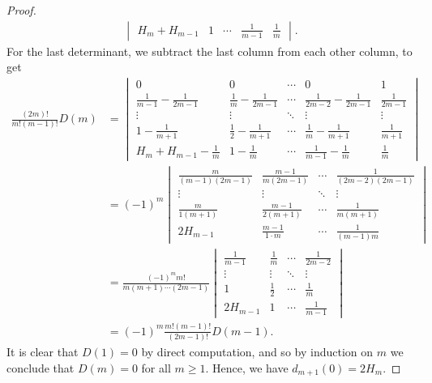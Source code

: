 \documentclass[11pt]{amsart}
\theoremstyle{definition}
\numberwithin{equation}{subsection}
\theoremstyle{plain}
\theoremstyle{plain}
\theoremstyle{plain}
\theoremstyle{plain}
\theoremstyle{plain}
\theoremstyle{plain}
\theoremstyle{plain}
\theoremstyle{plain}
\theoremstyle{plain}
\theoremstyle{plain}
\theoremstyle{plain}
\theoremstyle{plain}
\theoremstyle{definition}
\theoremstyle{definition}
\theoremstyle{definition}
\theoremstyle{remark}
\renewcommand{\(}{\textup{(}}
\renewcommand{\)}{\textup{)}}
\begin{document}
\begin{proof}
\begin{align*}
\begin{vmatrix}
          H_m+H_{m-1} & 1 & \cdots
           & \frac{1}{m-1} & \frac{1}{m}
        \end{vmatrix}.
    \end{align*}
For the last determinant, we subtract the last column from each other column, to get
    \begin{align*}
        \frac{(2m)!}{m!(m-1)!} D(m)
        &=
        \begin{vmatrix}
          0 & 0 & \cdots & 0 & 1 \\
          \frac{1}{m-1}-\frac{1}{2m-1} & \frac{1}{m}-\frac{1}{2m-1} & \cdots
           & \frac{1}{2m-2}-\frac{1}{2m-1} & \frac{1}{2m-1} \\
          \vdots & \vdots & \ddots & \vdots & \vdots \\
          1-\frac{1}{m+1} & \frac{1}{2}-\frac{1}{m+1} & \cdots
           & \frac{1}{m}-\frac{1}{m+1} & \frac{1}{m+1} \\
          H_m+H_{m-1}-\frac{1}{m} & 1-\frac{1}{m} & \cdots
           & \frac{1}{m-1}-\frac{1}{m} & \frac{1}{m}
        \end{vmatrix}\\
        &=
        (-1)^m
        \begin{vmatrix}
          \frac{m}{(m-1)(2m-1)} & \frac{m-1}{m(2m-1)} & \cdots
           & \frac{1}{(2m-2)(2m-1)} \\
          \vdots & \vdots & \ddots & \vdots \\
          \frac{m}{1(m+1)} & \frac{m-1}{2(m+1)} & \cdots
           & \frac{1}{m(m+1)} \\
          2H_{m-1} & \frac{m-1}{1\cdot m} & \cdots
           & \frac{1}{(m-1)m}
        \end{vmatrix}\\
        &=
        \frac{(-1)^m m!}{m(m+1)\cdots(2m-1)}
        \begin{vmatrix}
          \frac{1}{m-1} & \frac{1}{m} & \cdots
           & \frac{1}{2m-2} \\
          \vdots & \vdots & \ddots & \vdots \\
          1 & \frac{1}{2} & \cdots
           & \frac{1}{m} \\
          2H_{m-1} & 1 & \cdots
           & \frac{1}{m-1}
        \end{vmatrix}\\
        &=(-1)^m\frac{m!(m-1)!}{(2m-1)!}D(m-1).
    \end{align*}
It is clear that $D(1)=0$ by direct computation, and so by induction on $m$ we conclude that $D(m)=0$ for all $m\geq 1$. Hence, we have $d_{m+1}(0)=2H_m$.
\end{proof}
\end{document}
